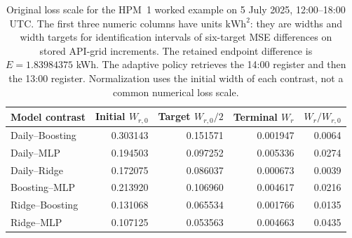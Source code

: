 \begin{table}[htbp]
\centering\small
\begin{tabular}{lrrrr}
\toprule
Model contrast & Initial $W_{r,0}$ & Target $W_{r,0}/2$ & Terminal $W_r$ & $W_r/W_{r,0}$\\
\midrule
Daily--Boosting & 0.303143 & 0.151571 & 0.001947 & 0.0064\\
Daily--MLP & 0.194503 & 0.097252 & 0.005336 & 0.0274\\
Daily--Ridge & 0.172075 & 0.086037 & 0.000673 & 0.0039\\
Boosting--MLP & 0.213920 & 0.106960 & 0.004617 & 0.0216\\
Ridge--Boosting & 0.131068 & 0.065534 & 0.001766 & 0.0135\\
Ridge--MLP & 0.107125 & 0.053563 & 0.004663 & 0.0435\\
\bottomrule
\end{tabular}
\caption{Original loss scale for the HPM~1 worked example on 5 July 2025, 12:00--18:00 UTC. The first three numeric columns have units $\mathrm{kWh}^2$: they are widths and width targets for identification intervals of six-target MSE differences on stored API-grid increments. The retained endpoint difference is $E=1.83984375$ kWh. The adaptive policy retrieves the 14:00 register and then the 13:00 register. Normalization uses the initial width of each contrast, not a common numerical loss scale.}
\label{tab:absolute_joint_widths}
\end{table}
